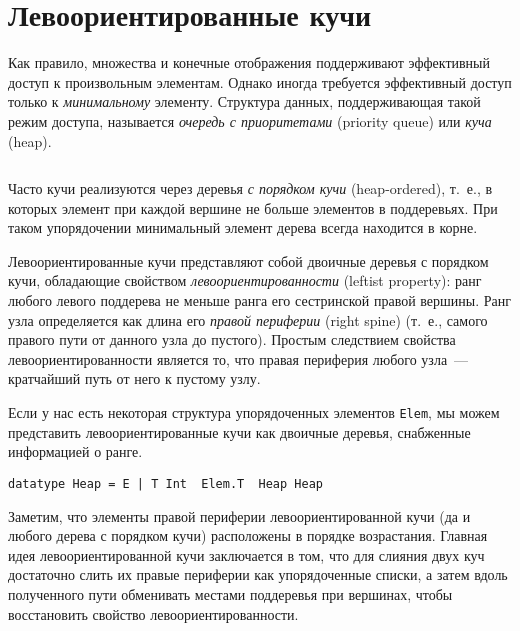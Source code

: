 \documentclass[aspectratio=169
  , xcolor={svgnames}
  , hyperref={ colorlinks,citecolor=DeepPink4
             , linkcolor=DarkRed,urlcolor=DarkBlue}
  , russian
  ]{beamer}
\newcommand{\term}[2]{\textit{#1} (#2)}
\theoremstyle{exerciseStyle1}
\renewcommand{\cite}[1]{}
\begin{document}
\section{Левоориентированные кучи}

\begin{frame}[fragile]{}
Как правило, множества и конечные отображения поддерживают эффективный
доступ к произвольным элементам. Однако иногда требуется эффективный
доступ только к \emph{минимальному} элементу.  Структура данных,
поддерживающая такой режим доступа, называется \term{очередь с
приоритетами}{priority queue} или \term{куча}{heap}.

\inputminted[firstline=3, lastline=11] {haskell}{code/Heap.hs}
\end{frame}

\begin{frame}[fragile]{}
Часто кучи реализуются через деревья \term{с порядком
  кучи}{heap-ordered}, т.~е., в которых элемент при каждой вершине не
больше элементов в поддеревьях. При таком упорядочении минимальный
элемент дерева всегда находится в корне.\vspace{1cm}

Левоориентированные кучи \cite{Crane1972, Knuth1973a} представляют
собой двоичные деревья с порядком кучи, обладающие свойством
\term{левоориентированности}{leftist property}: ранг любого левого поддерева
не меньше ранга его сестринской правой вершины.  Ранг узла
определяется как длина его \term{правой периферии}{right spine}
(т.~е., самого правого пути от данного узла до пустого).  Простым
следствием свойства левоориентированности является то, что правая
периферия любого узла~--- кратчайший путь от него к пустому узлу.
\end{frame}

\begin{frame}[fragile]
Если у нас есть некоторая структура упорядоченных элементов
\texttt{Elem}, 
мы можем представить левоориентированные кучи как
двоичные деревья, снабженные информацией о ранге.
\begin{verbatim}
datatype Heap = E | T Int  Elem.T  Heap Heap
\end{verbatim}

Заметим, что элементы правой периферии левоориентированной кучи (да и
любого дерева с порядком кучи) расположены в порядке возрастания.
Главная идея левоориентированной кучи заключается в том, что для
слияния двух куч достаточно слить их правые периферии как
упорядоченные списки, а затем вдоль полученного пути обменивать
местами поддеревья при вершинах, чтобы восстановить свойство
левоориентированности. 

\end{frame}
\end{document}

